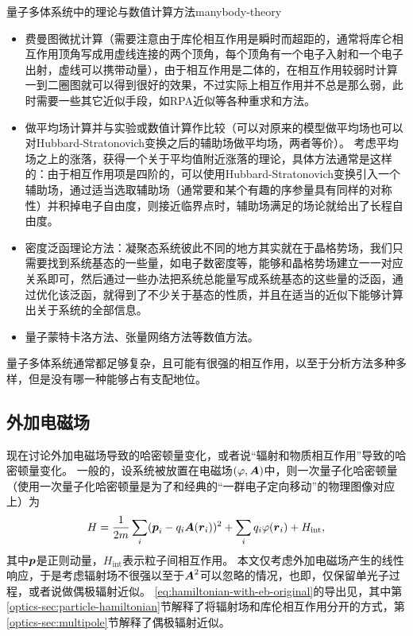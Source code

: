 \begin{back}{量子多体系统中的理论与数值计算方法}{manybody-theory}
    \begin{itemize}
        \item 费曼图微扰计算（需要注意由于库伦相互作用是瞬时而超距的，通常将库仑相互作用顶角写成用虚线连接的两个顶角，每个顶角有一个电子入射和一个电子出射，虚线可以携带动量），由于相互作用是二体的，在相互作用较弱时计算一到二圈图就可以得到很好的效果，不过实际上相互作用并不总是那么弱，此时需要一些其它近似手段，如RPA近似等各种重求和方法。
        \item 做平均场计算并与实验或数值计算作比较（可以对原来的模型做平均场也可以对Hubbard-Stratonovich变换之后的辅助场做平均场，两者等价）。
        考虑平均场之上的涨落，获得一个关于平均值附近涨落的理论，具体方法通常是这样的：由于相互作用项是四阶的，可以使用Hubbard-Stratonovich变换引入一个辅助场，通过适当选取辅助场（通常要和某个有趣的序参量具有同样的对称性）并积掉电子自由度，则接近临界点时，辅助场满足的场论就给出了长程自由度。
        \item 密度泛函理论方法：凝聚态系统彼此不同的地方其实就在于晶格势场，我们只需要找到系统基态的一些量，如电子数密度等，能够和晶格势场建立一一对应关系即可，然后通过一些办法把系统总能量写成系统基态的这些量的泛函，通过优化该泛函，就得到了不少关于基态的性质，并且在适当的近似下能够计算出关于系统的全部信息。
        \item 量子蒙特卡洛方法、张量网络方法等数值方法。
    \end{itemize}

    量子多体系统通常都足够复杂，且可能有很强的相互作用，以至于分析方法多种多样，但是没有哪一种能够占有支配地位。
\end{back}

\subsection{外加电磁场}

现在讨论外加电磁场导致的哈密顿量变化，或者说“辐射和物质相互作用”导致的哈密顿量变化。
一般的，设系统被放置在电磁场$(\varphi, \vb*{A})$中，则一次量子化哈密顿量（使用一次量子化哈密顿量是为了和经典的“一群电子定向移动”的物理图像对应上）为
\begin{equation}
    {H} = \frac{1}{2m} \sum_i ({\vb*{p}_i} - q_i \vb*{A}({\vb*{r}_i}))^2 + \sum_i q_i \varphi({\vb*{r}}_i) + {H}_\text{int},
    \label{eq:hamiltonian-with-eb-original}
\end{equation}
其中$\vb*{p}$是正则动量，${H}_\text{int}$表示粒子间相互作用。
本文仅考虑外加电磁场产生的线性响应，于是考虑辐射场不很强以至于$\vb*{A}^2$可以忽略的情况，也即，仅保留单光子过程，或者说做偶极辐射近似。%
\eqref{eq:hamiltonian-with-eb-original}的导出见\opticsdoc，其中第\ref{optics-sec:particle-hamiltonian}节解释了将辐射场和库伦相互作用分开的方式，第\ref{optics-sec:multipole}节解释了偶极辐射近似。

